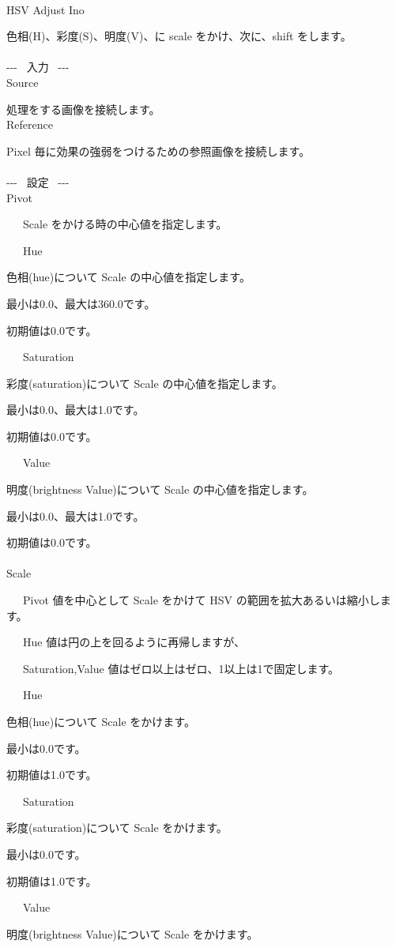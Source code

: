 \documentclass[a4paper,12pt]{article}
\begin{document}
\thispagestyle{empty}

\Large
\noindent \\
HSV Adjust Ino\medskip
\par
\normalsize
色相(H)、彩度(S)、明度(V)、に scale をかけ、次に、shift をします。\\
\\
-{-}- \ 入力 \ -{-}-\\
Source\par
処理をする画像を接続します。\\
Reference\par
Pixel 毎に効果の強弱をつけるための参照画像を接続します。\\
\\
-{-}- \ 設定 \ -{-}-\\
Pivot\par
\noindent \ \ \, Scale をかける時の中心値を指定します。\\
\par
\noindent \ \ \, Hue\par
色相(hue)について Scale の中心値を指定します。\par
最小は0.0、最大は360.0です。\par
初期値は0.0です。\par
\noindent \ \ \, Saturation\par
彩度(saturation)について Scale の中心値を指定します。\par
最小は0.0、最大は1.0です。\par
初期値は0.0です。\par
\noindent \ \ \, Value\par
明度(brightness Value)について Scale の中心値を指定します。\par
最小は0.0、最大は1.0です。\par
初期値は0.0です。\\
\\
Scale\par
\noindent \ \ \, Pivot 値を中心として Scale をかけて HSV の範囲を拡大あるいは縮小します。\par
\noindent \ \ \, Hue 値は円の上を回るように再帰しますが、\par
\noindent \ \ \, Saturation,Value 値はゼロ以上はゼロ、1以上は1で固定します。\\
\par
\noindent \ \ \, Hue\par
色相(hue)について Scale をかけます。\par
最小は0.0です。\par
初期値は1.0です。\par
\noindent \ \ \, Saturation\par
彩度(saturation)について Scale をかけます。\par
最小は0.0です。\par
初期値は1.0です。\par
\noindent \ \ \, Value\par
明度(brightness Value)について Scale をかけます。
\end{document}
